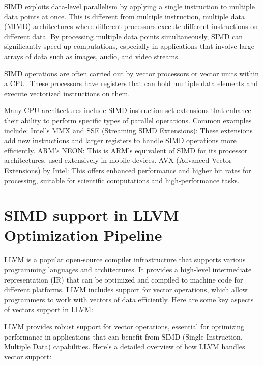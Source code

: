 SIMD exploits data-level parallelism by applying a single instruction
to multiple data points at once. This is different from multiple
instruction, multiple data (MIMD) architectures where different
processors execute different instructions on different data. By
processing multiple data points simultaneously, SIMD can significantly
speed up computations, especially in applications that involve large
arrays of data such as images, audio, and video streams.

SIMD operations are often carried out by vector processors or vector
units within a CPU. These processors have registers that can hold
multiple data elements and execute vectorized instructions on them.

Many CPU architectures include SIMD instruction set extensions that
enhance their ability to perform specific types of parallel
operations. Common examples include: Intel’s MMX and SSE (Streaming
SIMD Extensions): These extensions add new instructions and larger
registers to handle SIMD operations more efficiently. ARM’s NEON: This
is ARM’s equivalent of SIMD for its processor architectures, used
extensively in mobile devices. AVX (Advanced Vector Extensions) by
Intel: This offers enhanced performance and higher bit rates for
processing, suitable for scientific computations and high-performance
tasks.

\section{SIMD support in LLVM Optimization Pipeline}
\label{sec:llvm-vectors}

LLVM is a popular open-source compiler infrastructure that supports
various programming languages and architectures. It provides a
high-level intermediate representation (IR) that can be optimized and
compiled to machine code for different platforms. LLVM includes
support for vector operations, which allow programmers to work with
vectors of data efficiently. Here are some key aspects of vectors
support in LLVM:

LLVM provides robust support for vector operations, essential for
optimizing performance in applications that can benefit from SIMD
(Single Instruction, Multiple Data) capabilities. Here’s a detailed
overview of how LLVM handles vector support:

